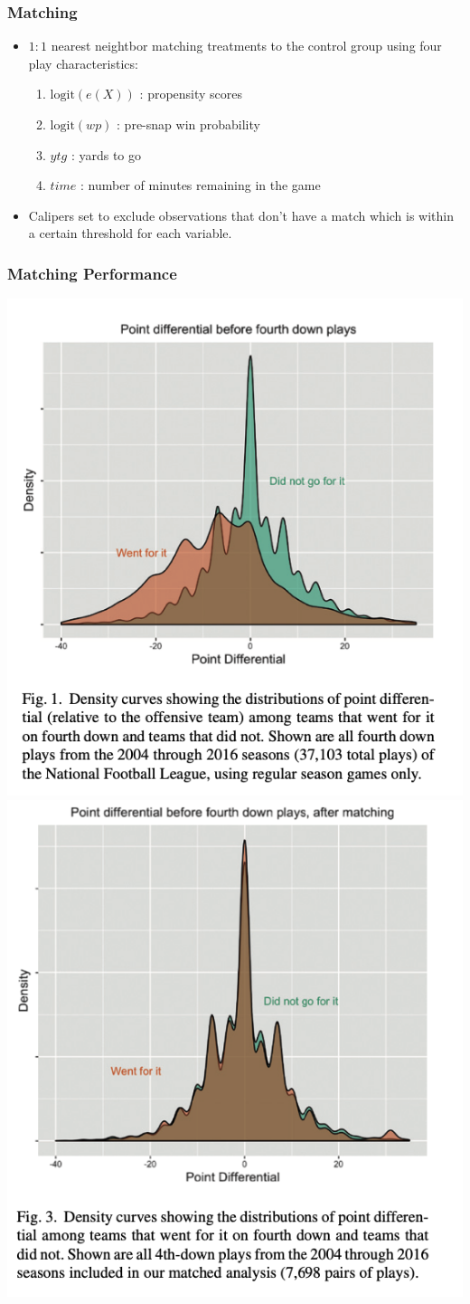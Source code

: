 \documentclass[t]{beamer}
\begin{document}
\begin{frame}
  \frametitle{Matching}
  \begin{itemize}
  \item $1:1$ nearest neightbor matching treatments to the control group using four play characteristics:
    \begin{enumerate}
    \item $\mathrm{logit}(e(X))$ : propensity scores
    \item $\mathrm{logit}(wp)$ : pre-snap win probability
    \item $ytg$ : yards to go
    \item $time$ : number of minutes remaining in the game
    \end{enumerate}
  \item Calipers set to exclude observations that don't have a match which is within a certain threshold for each variable. 
  \end{itemize}
\end{frame}

\begin{frame}
  \frametitle{Matching Performance}
  \includegraphics[width=0.4\linewidth]{./pre_matching.png}
  \includegraphics[width=0.4\linewidth]{./post_matching.png}
\end{frame}
\end{document}
